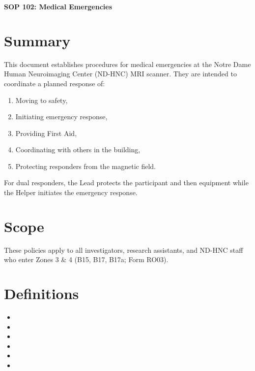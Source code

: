 \documentclass[11pt]{article}
\begin{document}
\renewcommand{\labelenumii}{\arabic{enumi}.\arabic{enumii}}
\renewcommand{\labelenumiii}{\arabic{enumi}.\arabic{enumii}.\arabic{enumiii}}
\renewcommand{\labelenumiv}{\arabic{enumi}.\arabic{enumii}.\arabic{enumiii}.\arabic{enumiv}}

\begin{center}
	\textbf{\Large SOP 102: Medical Emergencies}\\
	\hrulefill
\end{center}


\section{Summary}
This document establishes procedures for medical emergencies at the Notre Dame Human Neuroimaging Center (ND-HNC) MRI scanner. They are intended to coordinate a planned response of:

\begin{enumerate}
	\item Moving to safety,
	\item Initiating emergency response,
	\item Providing First Aid,
	\item Coordinating with others in the building,
	\item Protecting responders from the magnetic field.
\end{enumerate}

For dual responders, the Lead protects the participant and then equipment while the Helper initiates the emergency response.

\section{Scope}
These policies apply to all investigators, research assistants, and ND-HNC staff who enter Zones 3 \& 4 (B15, B17, B17a; Form RO03).

\section{Definitions}

\begin{itemize}
	\item \ControlRoom
	\item \ElectronicLock
	\item \Helper
	\item \Lead
	\item \MagnetRoom
	\item \Visitor
\end{itemize}
\end{document}
